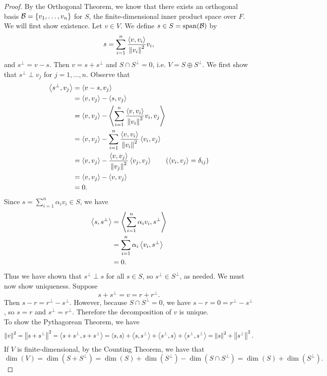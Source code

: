 \documentclass[class=article, crop=false]{standalone}
\begin{document}
  \begin{proof}
    By the Orthogonal Theorem, we know that there exists an orthogonal basis $\mathcal{B} = \left\{v_1,\dotsc,v_n\right\}$ for $S$, the finite-dimensional inner product space over $F$. We will first show existence. Let $v\in V$. We define $s\in S = \operatorname{span}(\mathcal{B})$ by
    \[
      s = \sum_{i=1}^{n}\frac{\left\langle v, v_i \right\rangle}{\left\lVert v_i\right\rVert^2}v_i,
    \]
    and $s^\perp = v - s$. Then $v = s + s^\perp$ and $S\cap S^\perp = 0$, i.e. $V = S\oplus S^\perp$. We first show that $s^\perp\perp v_j$ for $j = 1,\dotsc,n$. Observe that
    \begin{align*}
      \tup{s^\perp, v_j} &= \tup{v-s, v_j} \\
                         &= \tup{v, v_j} - \tup{s, v_j} \\
                         &= \tup{v, v_j} - \tup{\sum_{i=1}^{n}\frac{\tup{v, v_i}}{\norm{v_i}^2}v_i, v_j} \\
                         &= \tup{v, v_j} - \sum_{i=1}^{n}\frac{\tup{v, v_i}}{\norm{v_i}^2}\tup{v_i, v_j} \\
                         &= \tup{v, v_j} - \frac{\tup{v, v_j}}{\norm{v_j}^2}\tup{v_j, v_j} \tag{$\tup{v_i, v_j} = \delta_{ij}$} \\
                         &= \tup{v, v_j} - \tup{v, v_j} \\
                         &= 0.
    \end{align*}
    Since $s = \sum_{i=1}^{n}\alpha_iv_i\in S$, we have
    \begin{align*}
      \left\langle s, s^\perp \right\rangle &= \left\langle \sum_{i=1}^{n}\alpha_iv_i, s^\perp \right\rangle \\
                       &= \sum_{i=1}^{n}\alpha_i \left\langle v_i, s^\perp \right\rangle \\
                       &= 0.
    \end{align*}
    Thus we have shown that $s^\perp\perp s$ for all $s\in S$, so $s^\perp\in S^\perp$, as needed. We must now show uniqueness. Suppose
    \[
      s + s^\perp = v = r + r^\perp.
    \]
    Then $s-r = r^\perp - s^\perp$. However, because $S\cap S^\perp = 0$, we have $s - r = 0 = r^\perp - s^\perp$, so $s = r$ and $s^\perp = r^\perp$. Therefore the decomposition of $v$ is unique. \\[10pt]
    To show the Pythagorean Theorem, we have
    \[
      \left\lVert v\right\rVert^2 = \left\lVert s + s^\perp\right\rVert^2 = \left\langle s + s^\perp, s + s^\perp \right\rangle = \left\langle s, s \right\rangle + \left\langle s, s^\perp \right\rangle + \left\langle s^\perp, s \right\rangle + \left\langle s^\perp, s^\perp \right\rangle = \left\lVert s\right\rVert^2 + \left\lVert s^\perp\right\rVert^2.
    \]
    If $V$ is finite-dimensional, by the Counting Theorem, we have that
    \[
      \dim(V) = \dim(S + S^\perp) = \dim(S) + \dim(S^\perp) - \dim(S\cap S^\perp) = \dim(S) + \dim(S^\perp).
    \]
  \end{proof}
\end{document}
